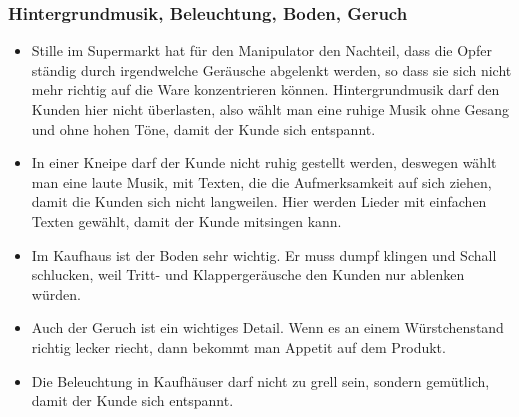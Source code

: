 \subsubsection{Hintergrundmusik, Beleuchtung, Boden, Geruch}
\begin{itemize}
	\item Stille im Supermarkt hat für den Manipulator den Nachteil, dass die Opfer ständig durch
irgendwelche Geräusche abgelenkt werden, so dass sie sich nicht mehr richtig auf die Ware
konzentrieren können. Hintergrundmusik darf den Kunden hier nicht überlasten, also wählt man eine
ruhige Musik ohne Gesang und ohne hohen Töne, damit der Kunde sich entspannt.

	\item In einer Kneipe darf der Kunde nicht ruhig gestellt werden, deswegen wählt man eine laute
Musik, mit Texten, die die Aufmerksamkeit auf sich ziehen, damit die Kunden sich nicht langweilen.
Hier werden Lieder mit einfachen Texten gewählt, damit der Kunde mitsingen kann.

	\item Im Kaufhaus ist der Boden sehr wichtig. Er muss dumpf klingen und Schall schlucken, weil
Tritt- und Klappergeräusche den Kunden nur ablenken würden.

	\item Auch der Geruch ist ein wichtiges Detail. Wenn es an einem Würstchenstand richtig lecker
riecht, dann bekommt man Appetit auf dem Produkt.

	\item Die Beleuchtung in Kaufhäuser darf nicht zu grell sein, sondern gemütlich, damit der Kunde
sich entspannt.
\end{itemize}


